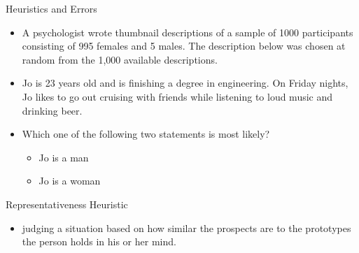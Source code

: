 \documentclass[
  ignorenonframetext,
]{beamer}
\providecommand{\tightlist}{%
  \setlength{\itemsep}{0pt}\setlength{\parskip}{0pt}}\usepackage{longtable,booktabs,array}
\begin{document}
\begin{frame}{Heuristics and Errors}
\protect\hypertarget{heuristics-and-errors}{}
\begin{itemize}
\tightlist
\item
  A psychologist wrote thumbnail descriptions of a sample of 1000
  participants consisting of 995 females and 5 males. The description
  below was chosen at random from the 1,000 available descriptions.
\end{itemize}

\begin{itemize}
\tightlist
\item
  Jo is 23 years old and is finishing a degree in engineering. On Friday
  nights, Jo likes to go out cruising with friends while listening to
  loud music and drinking beer.
\end{itemize}

\begin{itemize}
\tightlist
\item
  Which one of the following two statements is most likely?

  \begin{itemize}
  \tightlist
  \item
    Jo is a man
  \item
    Jo is a woman
  \end{itemize}
\end{itemize}
\end{frame}

\begin{frame}{Representativeness Heuristic}
\protect\hypertarget{representativeness-heuristic}{}
\begin{itemize}
\tightlist
\item
  judging a situation based on how similar the prospects are to the
  prototypes the person holds in his or her mind.
\end{itemize}
\end{frame}
\end{document}
